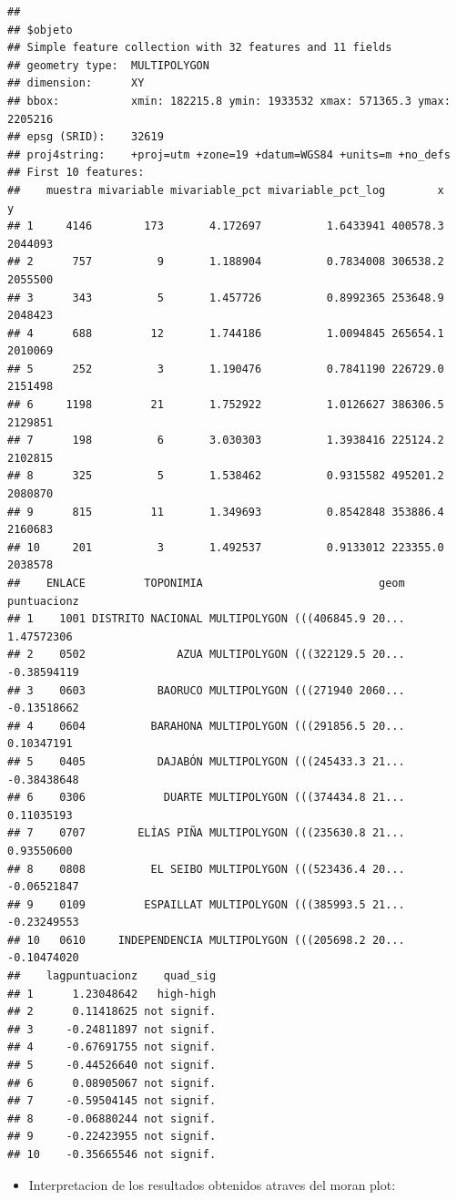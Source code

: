 \documentclass[11pt,]{article}
\providecommand{\tightlist}{%
\setlength{\itemsep}{0pt}\setlength{\parskip}{0pt}}
\begin{document}
\begin{verbatim}
## 
## $objeto
## Simple feature collection with 32 features and 11 fields
## geometry type:  MULTIPOLYGON
## dimension:      XY
## bbox:           xmin: 182215.8 ymin: 1933532 xmax: 571365.3 ymax: 2205216
## epsg (SRID):    32619
## proj4string:    +proj=utm +zone=19 +datum=WGS84 +units=m +no_defs
## First 10 features:
##    muestra mivariable mivariable_pct mivariable_pct_log        x       y
## 1     4146        173       4.172697          1.6433941 400578.3 2044093
## 2      757          9       1.188904          0.7834008 306538.2 2055500
## 3      343          5       1.457726          0.8992365 253648.9 2048423
## 4      688         12       1.744186          1.0094845 265654.1 2010069
## 5      252          3       1.190476          0.7841190 226729.0 2151498
## 6     1198         21       1.752922          1.0126627 386306.5 2129851
## 7      198          6       3.030303          1.3938416 225124.2 2102815
## 8      325          5       1.538462          0.9315582 495201.2 2080870
## 9      815         11       1.349693          0.8542848 353886.4 2160683
## 10     201          3       1.492537          0.9133012 223355.0 2038578
##    ENLACE         TOPONIMIA                           geom puntuacionz
## 1    1001 DISTRITO NACIONAL MULTIPOLYGON (((406845.9 20...  1.47572306
## 2    0502              AZUA MULTIPOLYGON (((322129.5 20... -0.38594119
## 3    0603           BAORUCO MULTIPOLYGON (((271940 2060... -0.13518662
## 4    0604          BARAHONA MULTIPOLYGON (((291856.5 20...  0.10347191
## 5    0405           DAJABÓN MULTIPOLYGON (((245433.3 21... -0.38438648
## 6    0306            DUARTE MULTIPOLYGON (((374434.8 21...  0.11035193
## 7    0707        ELÍAS PIÑA MULTIPOLYGON (((235630.8 21...  0.93550600
## 8    0808          EL SEIBO MULTIPOLYGON (((523436.4 20... -0.06521847
## 9    0109         ESPAILLAT MULTIPOLYGON (((385993.5 21... -0.23249553
## 10   0610     INDEPENDENCIA MULTIPOLYGON (((205698.2 20... -0.10474020
##    lagpuntuacionz    quad_sig
## 1      1.23048642   high-high
## 2      0.11418625 not signif.
## 3     -0.24811897 not signif.
## 4     -0.67691755 not signif.
## 5     -0.44526640 not signif.
## 6      0.08905067 not signif.
## 7     -0.59504145 not signif.
## 8     -0.06880244 not signif.
## 9     -0.22423955 not signif.
## 10    -0.35665546 not signif.
\end{verbatim}

\begin{itemize}
\tightlist
\item
  Interpretacion de los resultados obtenidos atraves del moran plot:
\end{itemize}
\end{document}

